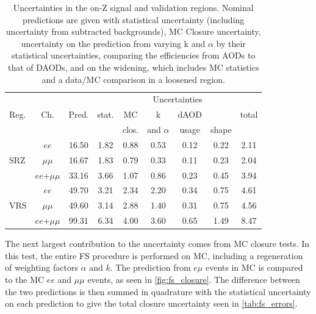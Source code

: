 \begin{table}
\begin{center}
 \begin{tabular}{lcc|cccccc}
 \hline 
 \multirow{3}{*}{Reg.}	& \multirow{3}{*}{Ch.} 	& \multirow{3}{*}{Pred.} & \multicolumn{6}{c}{Uncertainties} \\
   \cline{4-9} 
   		 	& 		 	& 	  		& stat.  		& MC 		& k  			& dAOD 		& \mll  	& total \\
   			& 			& 		 	& 			 	& clos. 	& and $\alpha$	& usage	 	& shape  	& \\
   \hline
   \hline
\multirow{3}{*}{SRZ}
& $ee$ & 16.50 & 1.82 & 0.88 & 0.53 & 0.12 & 0.22 & 2.11 \\ 
& $\mu\mu$ & 16.67 & 1.83 & 0.79 & 0.33 & 0.11 & 0.23 & 2.04 \\ 
& $ee$+$\mu\mu$ & 33.16 & 3.66 & 1.07 & 0.86 & 0.23 & 0.45 & 3.94 \\ 
\hline
\multirow{3}{*}{VRS}
& $ee$ & 49.70 & 3.21 & 2.34 & 2.20 & 0.34 & 0.75 & 4.61 \\ 
& $\mu\mu$ & 49.60 & 3.14 & 2.88 & 1.40 & 0.31 & 0.75 & 4.56 \\ 
& $ee$+$\mu\mu$ & 99.31 & 6.34 & 4.00 & 3.60 & 0.65 & 1.49 & 8.47 \\ 
\hline
 
\hline
\hline
 \end{tabular}
\end{center}
 \caption{
   Uncertainties in the on-Z signal and validation regions. Nominal predictions are given with statistical uncertainty (including uncertainty from subtracted backgrounds), MC Closure uncertainty, uncertainty on the prediction from varying k and $\alpha$ by their statistical uncertainties, comparing the efficiencies from AODs to that of DAODs, and on the \mll widening, which includes MC statistics and a data/MC comparison in a loosened region.
 }
 \label{tab:fs_errors}
\end{table}

The next largest contribution to the uncertainty comes from \ac{MC} closure tests. In this test, the entire \ac{FS} procedure is performed on \ttbar \ac{MC}, including a regeneration of weighting factors $\alpha$ and $k$. The prediction from $e\mu$ events in \ac{MC} is compared to the \ac{MC} $ee$ and $\mu\mu$ events, as seen in \autoref{fig:fs_closure}. The difference between the two predictions is then summed in quadrature with the statistical uncertainty on each prediction to give the total closure uncertainty seen in \autoref{tab:fs_errors}.

